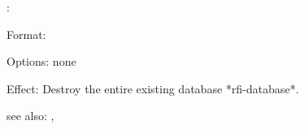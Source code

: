 \destroy:

Format: 

Options: none

Effect: Destroy the entire existing database *rfi-database*.

see also: \consult, \replace

